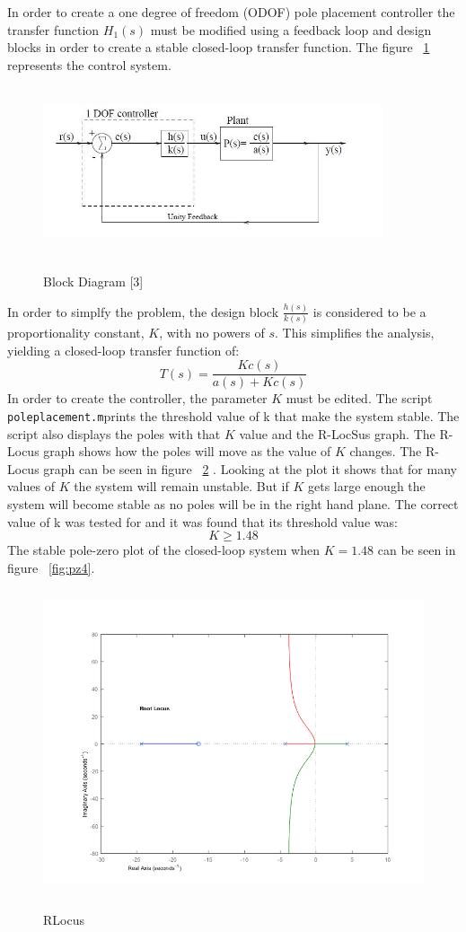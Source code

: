 \documentclass[12pt]{article} %
\begin{document}
In order to create a one degree of freedom (ODOF) pole placement controller the transfer function $H_1(s)$ must be modified using a feedback loop and design blocks in order to create a stable closed-loop transfer function. The figure ~\ref{fig:one_dof_block} represents the control system.
\begin{figure}[h] 
\caption{Block Diagram [3]}
\includegraphics[height=5cm, width = 10cm]{./images/one_dof_block.jpg}
\label{fig:one_dof_block}
\centering
\end{figure}
In order to simplfy the problem, the design block $\frac{h(s)}{k(s)}$ is considered to be a proportionality constant, $K$, with no powers of $s$. This simplifies the analysis, yielding a closed-loop transfer function of:
\begin{equation}
T(s) = \frac{Kc(s)}{a(s) + Kc(s)}
\end{equation}In order to create the controller, the parameter $K$ must be edited. The script \texttt{poleplacement.m}prints the threshold value of k that make the system stable. The script also displays the poles with that $K$ value and the R-LocSus graph. The R-Locus graph shows how the poles will move as the value of $K$ changes. The R-Locus graph can be seen in figure ~\ref{fig:root} . Looking at the plot it shows that for many values of $K$ the system will remain unstable. But if $K$ gets large enough the system will become stable as no poles will be in the right hand plane. The correct value of k was tested for and it was found that its threshold value was: 
\begin{equation}
K \geq 1.48
\end{equation}
The stable pole-zero plot of the closed-loop system when $K = 1.48$ can be seen in figure ~\ref{fig:pz4}. 
\begin{figure}
\caption{RLocus}
\includegraphics[height=9cm, width = 15cm]{polePlacementLotus.png}
\label{fig:root}
\centering
\end{figure}
\end{document}
